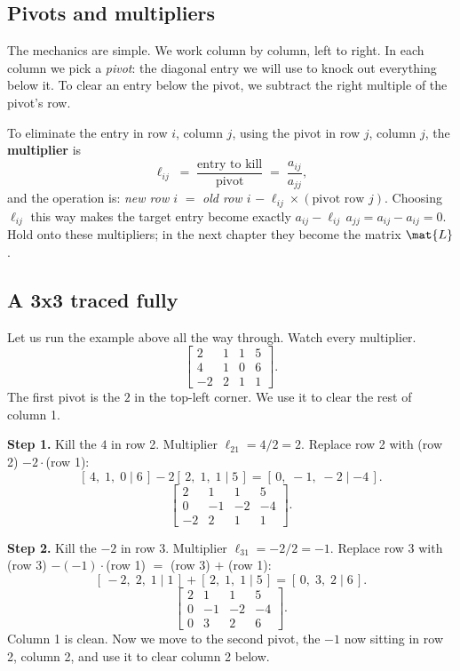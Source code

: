 \subsection{Pivots and multipliers}

The mechanics are simple. We work column by column, left to right. In each
column we pick a \emph{pivot}: the diagonal entry we will use to knock out
everything below it. To clear an entry below the pivot, we subtract the right
multiple of the pivot's row.

\begin{focusbox}
To eliminate the entry in row $i$, column $j$, using the pivot in row $j$,
column $j$, the \textbf{multiplier} is
\[
\ell_{ij} \;=\; \frac{\text{entry to kill}}{\text{pivot}}
\;=\; \frac{a_{ij}}{a_{jj}},
\]
and the operation is: \emph{new row $i$} $=$ \emph{old row $i$}
$-\;\ell_{ij}\times(\text{pivot row } j)$. Choosing $\ell_{ij}$ this way makes
the target entry become exactly $a_{ij} - \ell_{ij}\,a_{jj} = a_{ij} - a_{ij} =
0$. Hold onto these multipliers; in the next chapter they become the matrix
$\mat{L}$.
\end{focusbox}

\subsection{A 3x3 traced fully}

Let us run the example above all the way through. Watch every multiplier.
\[
\left[\begin{array}{ccc|c}
2 & 1 & 1 & 5\\
4 & 1 & 0 & 6\\
-2 & 2 & 1 & 1
\end{array}\right].
\]
The first pivot is the $2$ in the top-left corner. We use it to clear the rest of
column 1.

\textbf{Step 1.} Kill the $4$ in row 2. Multiplier $\ell_{21} = 4/2 = 2$.
Replace row 2 with (row 2) $- 2\cdot$(row 1):
\[
[\,4,\;1,\;0\mid 6\,] - 2[\,2,\;1,\;1\mid 5\,]
= [\,0,\;-1,\;-2\mid -4\,].
\]
\[
\left[\begin{array}{ccc|c}
2 & 1 & 1 & 5\\
0 & -1 & -2 & -4\\
-2 & 2 & 1 & 1
\end{array}\right].
\]

\textbf{Step 2.} Kill the $-2$ in row 3. Multiplier $\ell_{31} = -2/2 = -1$.
Replace row 3 with (row 3) $-(-1)\cdot$(row 1) $=$ (row 3) $+$ (row 1):
\[
[\,-2,\;2,\;1\mid 1\,] + [\,2,\;1,\;1\mid 5\,] = [\,0,\;3,\;2\mid 6\,].
\]
\[
\left[\begin{array}{ccc|c}
2 & 1 & 1 & 5\\
0 & -1 & -2 & -4\\
0 & 3 & 2 & 6
\end{array}\right].
\]
Column 1 is clean. Now we move to the second pivot, the $-1$ now sitting in row
2, column 2, and use it to clear column 2 below.

